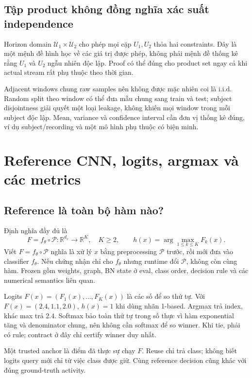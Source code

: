 \documentclass[11pt,a4paper]{article}
\newcommand{\R}{\mathbb R}
\newcommand{\Uset}{\mathcal U}
\theoremstyle{definition}
\begin{document}
\subsection{Tập product không đồng nghĩa xác suất independence}
Horizon domain $\Uset_1\times\Uset_2$ cho phép mọi cặp $U_1,U_2$ thỏa hai
constraints. Đây là một mệnh đề hình học về các giá trị được phép, không
phải mệnh đề thống kê rằng $U_1$ và $U_2$ ngẫu nhiên độc lập. Proof có thể
đúng cho product set ngay cả khi actual stream rất phụ thuộc theo thời gian.

Adjacent windows chung raw samples nên không được mặc nhiên coi là i.i.d.
Random split theo window có thể đưa mẫu chung sang train và test; subject
disjointness giải quyết một loại leakage, không khiến mọi window trong mỗi
subject độc lập. Mean, variance và confidence interval cần đơn vị thống kê
đúng, ví dụ subject/recording và một mô hình phụ thuộc có biện minh.

\section{Reference CNN, logits, argmax và các metrics}
\subsection{Reference là toàn bộ hàm nào?}
Định nghĩa đầy đủ là
\begin{equation}
F=f_\theta\circ\mathcal P:\R^{d_x}\to\R^K,\quad K\ge2,\qquad
h(x)=\arg\max_{1\le k\le K}F_k(x).
\end{equation}
Viết $F=f_\theta\circ\mathcal P$ nghĩa là xử lý $x$ bằng preprocessing
$\mathcal P$ trước, rồi mới đưa vào classifier $f_\theta$. Nếu chứng nhận
chỉ cho $f_\theta$ nhưng runtime đổi $\mathcal P$, không còn cùng hàm.
Frozen gồm weights, graph, BN state ở eval, class order, decision rule và
các numerical semantics liên quan.

Logits $F(x)=(F_1(x),\ldots,F_K(x))$ là các số để so thứ tự. Với
$F(x)=(2.4,1.1,2.0)$, $h(x)=1$ khi dùng nhãn 1-based. Argmax trả index,
khác max trả 2.4. Softmax bảo toàn thứ tự trong số thực vì hàm exponential
tăng và denominator chung, nên không cần softmax để so winner. Khi tie,
phải có rule; contract ở đây chỉ certify winner duy nhất.

Một trusted anchor là điểm đã thực sự chạy $F$. Reuse chỉ trả class; không
biết logits query mới chỉ từ việc class được giữ. Cùng reference decision
cũng khác với đúng ground-truth activity.
\end{document}
